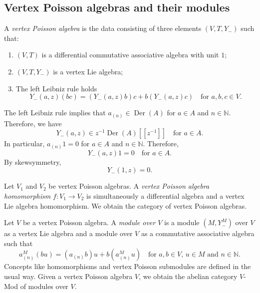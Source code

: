 \documentclass[a4paper, 12pt, reqno]{amsart}
\theoremstyle{remark}
\DeclareMathOperator{\Der}{Der}
\begin{document}
\subsection{Vertex Poisson algebras and their modules}
\label{sec:vert-poiss-algeb-1}

A \emph{vertex Poisson algebra} is the data consisting of three elements $(V, T, Y_-)$ such that:
\begin{enumerate}
\item $(V, T)$ is a differential commutative associative algebra with unit $1$;
\item $(V, T, Y_-)$ is a vertex Lie algebra;
\item The left Leibniz rule holds
  \begin{equation*}
    Y_-(a, z)(bc) = (Y_-(a, z)b)c + b(Y_-(a, z)c) \quad \text{for $a, b, c \in V$}.
  \end{equation*}
\end{enumerate}
The left Leibniz rule implies that $a_{(n)} \in \Der(A)$ for $a \in A$ and $n \in \mathbb{N}$.
Therefore, we have
\begin{equation*}
  Y_-(a, z) \in z^{-1}\Der(A)[[z^{-1}]] \quad \text{for $a \in A$}.
\end{equation*}
In particular, $a_{(n)}1 = 0$ for $a \in A$ and $n \in \mathbb{N}$.
Therefore,
\begin{equation*}
  Y_-(a, z)1 = 0 \quad \text{for $a \in A$}.
\end{equation*}
By skewsymmetry,
\begin{equation*}
  Y_-(1, z) = 0.
\end{equation*}

Let $V_1$ and $V_2$ be vertex Poisson algebras.
A \emph{vertex Poisson algebra homomorphism} $f: V_1 \to V_2$ is simultaneously a differential algebra and a vertex Lie algebra homomorphism.
We obtain the category of vertex Poisson algebras.

Let $V$ be a vertex Poisson algebra.
A \emph{module over $V$} is a module $(M, Y^M_-)$ over $V$ as a vertex Lie algebra and a module over $V$ as a commutative associative algebra such that
\begin{equation*}
  a^M_{(n)}(bu) = (a_{(n)}b)u + b(a^M_{(n)}u) \quad \text{for $a, b \in V$, $u \in M$ and $n \in \mathbb{N}$}.
\end{equation*}
Concepts like homomorphisms and vertex Poisson submodules are defined in the usual way.
Given a vertex Poisson algebra $V$, we obtain the abelian category $V$-Mod of modules over $V$.
\end{document}
